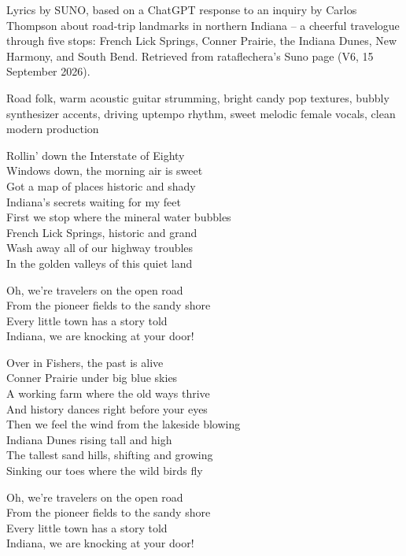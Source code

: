 
\begin{notes}
Lyrics by SUNO, based on a ChatGPT response to an inquiry by Carlos Thompson about road-trip landmarks in northern Indiana -- a cheerful travelogue through five stops: French Lick Springs, Conner Prairie, the Indiana Dunes, New Harmony, and South Bend. Retrieved from rataflechera's Suno page (V6, 15 September 2026).
\end{notes}
\begin{style}
Road folk, warm acoustic guitar strumming, bright candy pop textures, bubbly synthesizer accents, driving uptempo rhythm, sweet melodic female vocals, clean modern production
\end{style}
\begin{lyrics}
Rollin' down the Interstate of Eighty\\
Windows down, the morning air is sweet\\
Got a map of places historic and shady\\
Indiana's secrets waiting for my feet\\
First we stop where the mineral water bubbles\\
French Lick Springs, historic and grand\\
Wash away all of our highway troubles\\
In the golden valleys of this quiet land

Oh, we're travelers on the open road\\
From the pioneer fields to the sandy shore\\
Every little town has a story told\\
Indiana, we are knocking at your door!

Over in Fishers, the past is alive\\
Conner Prairie under big blue skies\\
A working farm where the old ways thrive\\
And history dances right before your eyes\\
Then we feel the wind from the lakeside blowing\\
Indiana Dunes rising tall and high\\
The tallest sand hills, shifting and growing\\
Sinking our toes where the wild birds fly

Oh, we're travelers on the open road\\
From the pioneer fields to the sandy shore\\
Every little town has a story told\\
Indiana, we are knocking at your door!


\end{lyrics}
